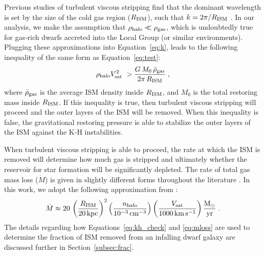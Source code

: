 \documentclass[usenatbib]{mn2e}
\newcommand{\msun}{{\rm M}_{\odot}}
\newcommand{\gt}{>}
\begin{document}
Previous studies of turbulent viscous stripping find that the dominant
wavelength is set by the size of the cold gas region ($R_{\rm ISM}$),
such that $k = 2\pi / R_{\rm ISM}$ \citep{nulsen82, murray93}.  In our
analysis, we make the assumption that $\rho_{\rm halo} \ll \rho_{\rm
  gas}$, which is undoubtedly true for gas-rich dwarfs accreted into
the Local Group (or similar environments). Plugging these
approximations into Equation~\ref{eq:k}, leads to the following
inequality of the same form as Equation~\ref{eq:test}:
%
\begin{equation}
  \rho_{\rm halo} V_{\rm sat}^{2} \ \gt \frac{G \, M_{0} \, \bar{\rho}_{\rm
      gas}}{2 \pi \, R_{\rm ISM}}  \; ,
\label{eq:kh_check}
\end{equation}
%
where $\bar{\rho}_{\rm gas}$ is the average ISM density inside $R_{\rm
  ISM}$, and $M_{0}$ is the total restoring mass inside $R_{\rm
  ISM}$. If this inequality is true, then turbulent viscous stripping
will proceed and the outer layers of the ISM will be removed. When
this inequality is false, the gravitational restoring pressure is able
to stabilize the outer layers of the ISM against the K-H instabilities.
%

When turbulent viscous stripping is able to proceed, the rate at which
the ISM is removed will determine how much gas is stripped and
ultimately whether the reservoir for star formation will be
significantly depleted. The rate of total gas mass loss ($\dot{M}$) is
given in slightly different forms throughout the literature
\citep[e.g.][]{nulsen82, mori00, roediger05}. In this work, we adopt
the following approximation from \citet{roediger05}:
%
\begin{equation}
  \dot{M} \approx 20 \, \left (\frac{R_{\rm ISM}}{20 \, {\rm kpc}} \right )^{2}
  \left (\frac{n_{\rm halo}}{10^{-3} \, {\rm cm}^{-3}} \right ) \left
    (\frac{V_{\rm sat}}{1000 \, {\rm km} \, {\rm s}^{-1}} \right )
\frac{\msun}{\rm yr} \; .
\label{eq:mloss}
\end{equation}
%
The details regarding how Equations~\ref{eq:kh_check} and
\ref{eq:mloss} are used to determine the fraction of ISM removed from
an infalling dwarf galaxy are discussed further in
Section~\ref{subsec:frac}. 
\end{document}

